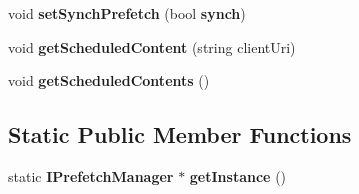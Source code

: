 \begin{CompactItemize}
\item 
void \textbf{setSynchPrefetch} (bool {\bf synch})\label{classbr_1_1pucrio_1_1telemidia_1_1ginga_1_1ncl_1_1prefetch_1_1PrefetchManager_45cfe7df2fcc711f7581e91458afa9a3}

\item 
void \textbf{getScheduledContent} (string clientUri)\label{classbr_1_1pucrio_1_1telemidia_1_1ginga_1_1ncl_1_1prefetch_1_1PrefetchManager_cee12527791e503005dc770c4dd41326}

\item 
void \textbf{getScheduledContents} ()\label{classbr_1_1pucrio_1_1telemidia_1_1ginga_1_1ncl_1_1prefetch_1_1PrefetchManager_97dacec09fb088b090f09a7a226952de}

\end{CompactItemize}
\subsection*{Static Public Member Functions}
\begin{CompactItemize}
\item 
static {\bf IPrefetchManager} $\ast$ \textbf{getInstance} ()\label{classbr_1_1pucrio_1_1telemidia_1_1ginga_1_1ncl_1_1prefetch_1_1PrefetchManager_a1fd1c2b4416e0c387c61f84410a0d65}

\end{CompactItemize}
